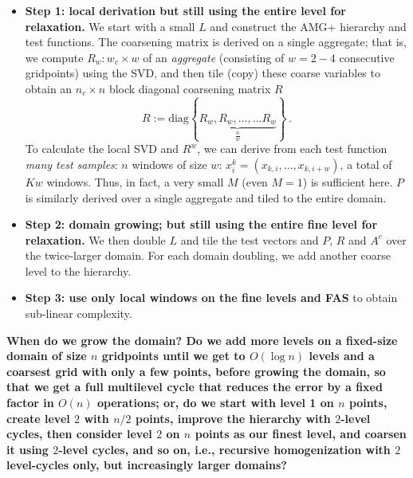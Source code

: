 \documentclass{article}
\begin{document}
\begin{itemize}
\item {\bf Step 1: local derivation but still using the entire level for relaxation.}
We start with a small $L$ and construct the AMG+ hierarchy and test functions. The coarsening matrix is derived on a single aggregate; that is, we compute $R_w: w_c \times w$ of an \emph{aggregate} (consisting of $w = 2-4$ consecutive gridpoints) using the SVD, and then  tile (copy) these coarse variables to obtain an $n_c \times n$ block diagonal coarsening matrix $R$
\begin{equation}
	R := \text{diag} \left\{ \underbrace{R_w, R_w, \dots, ... R_w }_{\frac{n}{w}}  \right\} \,.
\end{equation}
To calculate the local SVD and $R^w$, we can derive from each test function \emph{many test samples}: $n$ windows of size $w$: $x^k_i = (x_{k,i},\dots,x_{k,i+w})$, a total of $Kw$ windows. Thus, in fact, a very small $M$ (even $M=1$) is sufficient here. $P$ is similarly derived over a single aggregate and tiled to the entire domain.

\item {\bf Step 2: domain growing; but still using the entire fine level for relaxation.} We then double $L$ and tile the test vectors and $P$, $R$ and $A^c$ over the twice-larger domain. For each domain doubling, we add another coarse level to the hierarchy. 

\item {\bf Step 3: use only local windows on the fine levels and FAS} to obtain sub-linear complexity.
\end{itemize}

{\bf When do we grow the domain? Do we add more levels on a fixed-size domain of size $n$ gridpoints until we get to $O(\log n)$ levels and a coarsest grid with only a few points, before growing the domain, so that we get a full multilevel cycle that reduces the error by a fixed factor in $O(n)$ operations; or, do we start with level 1 on $n$ points, create level $2$ with $n/2$ points, improve the hierarchy with $2$-level cycles, then consider level $2$ on $n$ points as our finest level, and coarsen it using $2$-level cycles, and so on, i.e., recursive homogenization with $2$ level-cycles only, but increasingly larger domains?}
\end{document}

